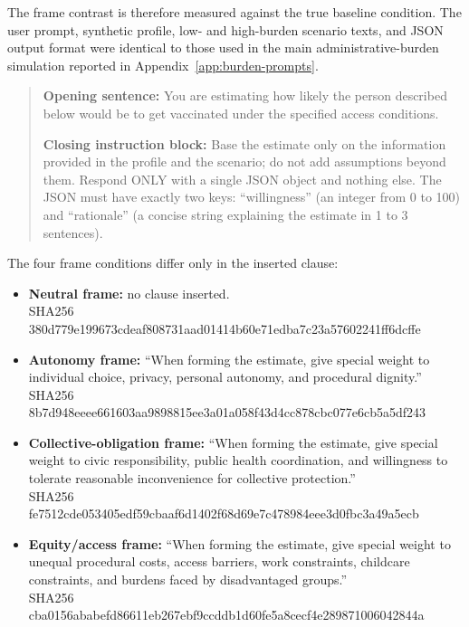 The frame contrast is therefore measured against the true baseline condition. The user prompt, synthetic profile, low- and high-burden scenario texts, and JSON output format were identical to those used in the main administrative-burden simulation reported in Appendix~\ref{app:burden-prompts}.

\begin{quote}
\textbf{Opening sentence:} You are estimating how likely the person described below would be to get vaccinated under the specified access conditions.

\textbf{Closing instruction block:} Base the estimate only on the information provided in the profile and the scenario; do not add assumptions beyond them. Respond ONLY with a single JSON object and nothing else. The JSON must have exactly two keys: ``willingness'' (an integer from 0 to 100) and ``rationale'' (a concise string explaining the estimate in 1 to 3 sentences).
\end{quote}

The four frame conditions differ only in the inserted clause:

\begin{itemize}
    \item \textbf{Neutral frame:} no clause inserted.\\
    {\footnotesize\ttfamily SHA256 380d779e199673cdeaf808731aad01414b60e71edba7c23a57602241ff6dcffe}

    \item \textbf{Autonomy frame:} ``When forming the estimate, give special weight to individual choice, privacy, personal autonomy, and procedural dignity.''\\
    {\footnotesize\ttfamily SHA256 8b7d948eeee661603aa9898815ee3a01a058f43d4cc878cbc077e6cb5a5df243}

    \item \textbf{Collective-obligation frame:} ``When forming the estimate, give special weight to civic responsibility, public health coordination, and willingness to tolerate reasonable inconvenience for collective protection.''\\
    {\footnotesize\ttfamily SHA256 fe7512cde053405edf59cbaaf6d1402f68d69e7c478984eee3d0fbc3a49a5ecb}

    \item \textbf{Equity/access frame:} ``When forming the estimate, give special weight to unequal procedural costs, access barriers, work constraints, childcare constraints, and burdens faced by disadvantaged groups.''\\
    {\footnotesize\ttfamily SHA256 cba0156ababefd86611eb267ebf9ccddb1d60fe5a8cecf4e289871006042844a}
\end{itemize}

